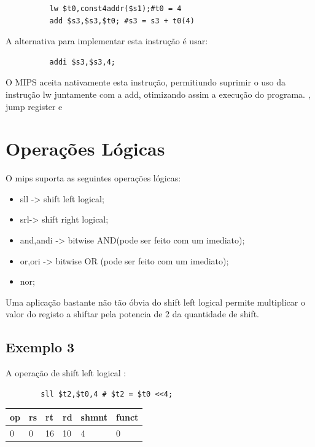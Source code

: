 \documentclass[10pt,a4paper]{book}
\begin{document}
		\begin{lstlisting}
		  lw $t0,const4addr($s1);#t0 = 4
		  add $s3,$s3,$t0; #s3 = s3 + t0(4)
		\end{lstlisting}

	      A alternativa para implementar esta instrução é usar:

		\begin{lstlisting}
		  addi $s3,$s3,4;
		\end{lstlisting}

	      O MIPS aceita nativamente esta instrução, permitiundo suprimir o uso da instrução lw juntamente com a add, otimizando assim a execução do programa.
, jump register e
	  \section{Operações Lógicas}

	    O mips suporta as seguintes operações lógicas:
	      \begin{itemize}
	       \item sll -> shift left logical;
	       \item srl-> shift right logical;
	       \item and,andi -> bitwise AND(pode ser feito com um imediato);
	       \item or,ori   -> bitwise OR (pode ser feito com um imediato);
	       \item nor;
	      \end{itemize}

	      Uma aplicação bastante não tão óbvia do shift left logical permite multiplicar o valor do registo a shiftar pela potencia de 2 da quantidade de shift.

	    \subsection{Exemplo 3}

	      A operação de shift left logical :

	      \begin{lstlisting}
		sll $t2,$t0,4 # $t2 = $t0 <<4;
	      \end{lstlisting}

	      \begin{center}
\begin{tabular}{|l|l|l|l|l|l|}\hline
op & rs & rt & rd & shmnt & funct\\\hline
0 & 0 & 16 & 10 & 4 & 0\\\hline
	      \end{tabular}
	      \end{center}
\end{document}

